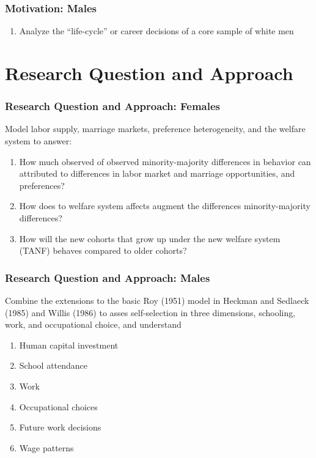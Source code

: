 \begin{frame}
	\frametitle{Motivation: Males}	
	\begin{enumerate}
		\item Analyze the ``life-cycle'' or career decisions of a core sample of white men
	\end{enumerate}
\end{frame}

\section{Research Question and Approach}
\begin{frame}
	\frametitle{Research Question and Approach: Females}
		\begin{wideitemize}
			\item Model labor supply, marriage markets, preference heterogeneity, and the welfare system to answer:
			\begin{enumerate}
			\item How much observed of observed minority-majority differences in behavior can attributed to differences in labor market and marriage opportunities, and preferences?
			\item How does to welfare system affects augment the differences minority-majority differences?
			\item How will the new cohorts that grow up under the new welfare system (TANF) behaves compared to older cohorts?
			\end{enumerate}
		\end{wideitemize}	
\end{frame}

\begin{frame}
	\frametitle{Research Question and Approach: Males}
		\begin{wideitemize}
			\item Combine the extensions to the basic Roy (1951) model in Heckman and Sedlaeck (1985) and Willis (1986) to asses self-selection in three dimensions, schooling, work, and occupational choice, and understand
			\begin{enumerate}
				\item Human capital investment
				\item School attendance
				\item Work
				\item Occupational choices
				\item Future work decisions
				\item Wage patterns
			\end{enumerate}			 
		\end{wideitemize}
\end{frame}

